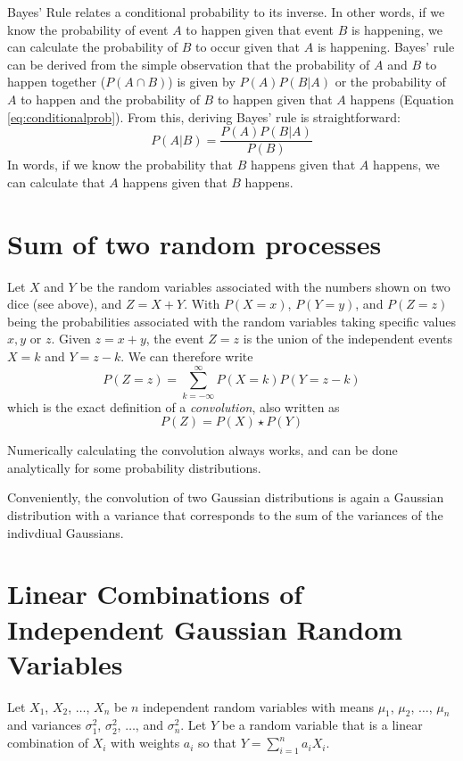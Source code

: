 Bayes' Rule relates a conditional probability to its inverse. In other words, if we know the probability of event $A$ to happen given that event $B$ is happening, we can calculate the probability of $B$ to occur given that $A$ is happening. Bayes' rule can be derived from the simple observation that the probability of $A$ and $B$ to happen together ($P(A \cap B)$) is given by $P(A)P(B|A)$ or the probability of $A$ to happen and the probability of $B$ to happen given that $A$ happens (Equation \ref{eq:conditionalprob}). 
From this, deriving Bayes' rule is straightforward:
\begin{equation}
P(A|B)=\frac{P(A)P(B|A)}{P(B)}
\end{equation}
In words, if we know the probability that $B$ happens given that $A$ happens, we can calculate that $A$ happens given that $B$ happens. 

\section{Sum of two random processes}\label{sec:convolution}
Let $X$ and $Y$ be the random variables associated with the numbers shown on two dice (see above), and $Z=X+Y$. With $P(X=x)$, $P(Y=y)$, and $P(Z=z)$ being the probabilities associated with the random variables taking specific values $x,y$ or $z$. Given $z=x+y$, the event $Z=z$ is the union of the independent events $X=k$ and $Y=z-k$. We can therefore write
\begin{equation}
P(Z=z)=\sum_{k=-\infty}^{\infty}P(X=k)P(Y=z-k)
\end{equation}
which is the exact definition of a \emph{convolution}, also written as 
\begin{equation}
P(Z)=P(X)\star P(Y)
\end{equation}

Numerically calculating the convolution always works, and can be done analytically for some probability distributions. 

Conveniently, the convolution of two Gaussian distributions is again a Gaussian distribution with a variance that corresponds to the sum of the variances of the indivdiual Gaussians. 

\section{Linear Combinations of Independent Gaussian Random Variables}\label{sec:lcombrandom}
Let $X_1$, $X_2$, $\ldots$, $X_n$ be $n$ independent random variables with means $\mu_1$, $\mu_2$, $\ldots$, $\mu_n$ and variances $\sigma_1^2$, $\sigma_2^2$, $\ldots$, and $\sigma^2_n$. Let $Y$ be a random variable that is a linear combination of $X_i$ with weights $a_i$ so that $Y=\sum_{i=1}^na_iX_i$. 

